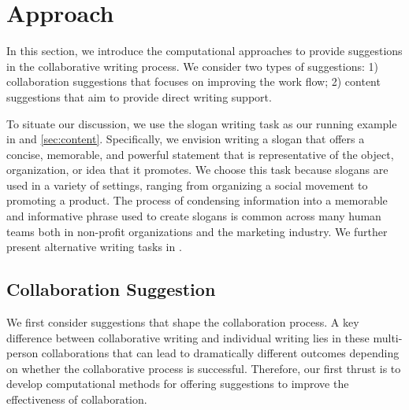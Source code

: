 
\section{Approach}


In this section, we introduce the computational approaches to provide suggestions in the collaborative writing process.
We consider two types of suggestions: 1) collaboration suggestions that focuses on improving the work flow;
2) content suggestions that aim to provide direct writing support.

To situate our discussion, we use the slogan writing task as our running example in  and \ref{sec:content}.
Specifically, we envision writing a slogan that offers a concise, memorable,
and powerful statement that is representative of the object,
organization, or idea that it promotes.
We choose this task because slogans are used in a variety of settings, ranging
from organizing a social movement to promoting a product.
The process of condensing information into a memorable and
informative phrase used to create slogans is common across many human teams both in non-profit organizations and the marketing industry.
We further present alternative writing tasks in .


\subsection{Collaboration Suggestion}
\label{sec:workflow}

We first consider suggestions that shape the collaboration process.
A key difference between collaborative writing and individual writing lies in these multi-person collaborations that can lead to dramatically different outcomes
depending on whether the collaborative process is successful.
Therefore, our first thrust is to develop computational methods for offering suggestions to improve the effectiveness of collaboration.


